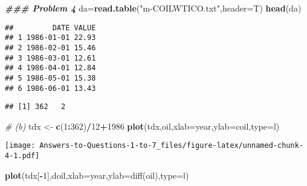 \documentclass[
]{article}
\newenvironment{Shaded}{\begin{snugshade}}{\end{snugshade}}
\newcommand{\AttributeTok}[1]{\textcolor[rgb]{0.13,0.29,0.53}{#1}}
\newcommand{\CommentTok}[1]{\textcolor[rgb]{0.56,0.35,0.01}{\textit{#1}}}
\newcommand{\DecValTok}[1]{\textcolor[rgb]{0.00,0.00,0.81}{#1}}
\newcommand{\DocumentationTok}[1]{\textcolor[rgb]{0.56,0.35,0.01}{\textbf{\textit{#1}}}}
\newcommand{\FunctionTok}[1]{\textcolor[rgb]{0.13,0.29,0.53}{\textbf{#1}}}
\newcommand{\NormalTok}[1]{#1}
\newcommand{\OtherTok}[1]{\textcolor[rgb]{0.56,0.35,0.01}{#1}}
\newcommand{\SpecialCharTok}[1]{\textcolor[rgb]{0.81,0.36,0.00}{\textbf{#1}}}
\newcommand{\StringTok}[1]{\textcolor[rgb]{0.31,0.60,0.02}{#1}}
\begin{document}
\begin{Shaded}
\begin{Highlighting}[]
\DocumentationTok{\#\#\# Problem 4}
\NormalTok{da}\OtherTok{=}\FunctionTok{read.table}\NormalTok{(}\StringTok{"m{-}COILWTICO.txt"}\NormalTok{,}\AttributeTok{header=}\NormalTok{T)}
\FunctionTok{head}\NormalTok{(da)}
\end{Highlighting}
\end{Shaded}

\begin{verbatim}
##         DATE VALUE
## 1 1986-01-01 22.93
## 2 1986-02-01 15.46
## 3 1986-03-01 12.61
## 4 1986-04-01 12.84
## 5 1986-05-01 15.38
## 6 1986-06-01 13.43
\end{verbatim}

\begin{Shaded}
\end{Shaded}

\begin{verbatim}
## [1] 362   2
\end{verbatim}

\begin{Shaded}
\begin{Highlighting}[]
\CommentTok{\# (b)}
\NormalTok{tdx }\OtherTok{\textless{}{-}} \FunctionTok{c}\NormalTok{(}\DecValTok{1}\SpecialCharTok{:}\DecValTok{362}\NormalTok{)}\SpecialCharTok{/}\DecValTok{12}\SpecialCharTok{+}\DecValTok{1986}
\FunctionTok{plot}\NormalTok{(tdx,oil,}\AttributeTok{xlab=}\StringTok{\textquotesingle{}year\textquotesingle{}}\NormalTok{,}\AttributeTok{ylab=}\StringTok{\textquotesingle{}coil\textquotesingle{}}\NormalTok{,}\AttributeTok{type=}\StringTok{\textquotesingle{}l\textquotesingle{}}\NormalTok{)}
\end{Highlighting}
\end{Shaded}

\texttt{[image: Answers-to-Questions-1-to-7\_files/figure-latex/unnamed-chunk-4-1.pdf]}

\begin{Shaded}
\begin{Highlighting}[]
\FunctionTok{plot}\NormalTok{(tdx[}\SpecialCharTok{{-}}\DecValTok{1}\NormalTok{],doil,}\AttributeTok{xlab=}\StringTok{\textquotesingle{}year\textquotesingle{}}\NormalTok{,}\AttributeTok{ylab=}\StringTok{\textquotesingle{}diff(oil)\textquotesingle{}}\NormalTok{,}\AttributeTok{type=}\StringTok{\textquotesingle{}l\textquotesingle{}}\NormalTok{)}
\end{Highlighting}
\end{Shaded}
\end{document}
